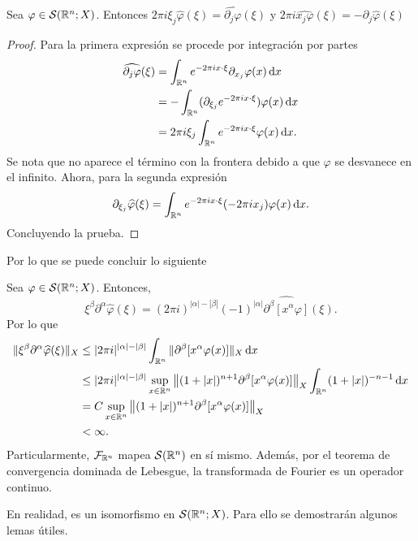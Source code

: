 \begin{theorem}
    Sea $\varphi\in\mathcal{S}(\mathbb{R}^n;X)$. Entonces $2\pi i\xi_j\widehat{\varphi}(\xi)
    = \widehat{\partial_j\varphi}(\xi)$ y 
    $ 2\pi i \widehat{x_j\varphi}(\xi) = - \partial_j\widehat{\varphi}(\xi)$
\end{theorem}
\begin{proof}
    Para la primera expresión se procede por integración por partes
    \begin{align*}
        \widehat{\partial_j\varphi}(\xi) & = \int_{\mathbb{R}^n} e^{-2\pi i x\cdot \xi} 
        \partial_{x_j}\varphi(x) \mathop{}\!\mathrm{d} x \\
        & = - \int_{\mathbb{R}^n} (\partial_{\xi_j} e^{-2\pi i x\cdot \xi}) 
        \varphi(x) \mathop{}\!\mathrm{d} x\\
        & = 2\pi i \xi_j \int_{\mathbb{R}^n} e^{-2\pi i x\cdot \xi} 
        \varphi(x) \mathop{}\!\mathrm{d} x.
    \end{align*}
    Se nota que no aparece el término con la frontera debido a que $\varphi$ 
    se desvanece en el infinito. Ahora, para la segunda expresión 
    \begin{equation*}
        \partial_{\xi_j} \widehat{\varphi}(\xi) = 
        \int_{\mathbb{R}^n}  e^{-2\pi i x\cdot \xi} (-2\pi i x_j)
        \varphi(x) \mathop{}\!\mathrm{d} x.
    \end{equation*}
    Concluyendo la prueba.
\end{proof}
Por lo que se puede concluir lo siguiente 
\begin{corollary}
    Sea $\varphi\in\mathcal{S}(\mathbb{R}^n;X)$. Entonces, 
    \begin{equation*}
        \xi^\beta \partial^\alpha \widehat{\varphi}(\xi) = 
        (2\pi i)^{|\alpha|-|\beta|} (-1)^{|\alpha|} \widehat{\partial^\beta 
        [x^\alpha \varphi]}(\xi).
    \end{equation*}
    Por lo que 
    \begin{align*}
        \|\xi^\beta \partial^\alpha \widehat{\varphi}(\xi)\|_X & \leq 
        |2\pi i|^{|\alpha|-|\beta|} \int_{\mathbb{R}^n} \|\partial^\beta 
        [x^\alpha \varphi(x)]\|_X \mathop{}\!\mathrm{d} x \\
        & \leq |2\pi i|^{|\alpha|-|\beta|} \sup_{x\in\mathbb{R}^n} 
        \left\|(1+|x|)^{n+1} \partial^\beta 
        [x^\alpha \varphi(x)]\right\|_X \int_{\mathbb{R}^n} (1+|x|)^{-n-1}\mathop{}\!\mathrm{d} x \\
        & = C \sup_{x\in\mathbb{R}^n} \left\|(1+|x|)^{n+1} \partial^\beta 
        [x^\alpha \varphi(x)]\right\|_X \\
        & < \infty.
    \end{align*}
    Particularmente, $\mathcal{F}_{\mathbb{R}^n}$ mapea $\mathcal{S}(\mathbb{R}^n)$ en sí 
    mismo. Además, por el teorema de convergencia dominada de Lebesgue, 
    la transformada de Fourier es un operador continuo.
\end{corollary}
En realidad, es un isomorfismo en $\mathcal{S}(\mathbb{R}^n;X)$. Para ello se demostrarán 
algunos lemas útiles.


